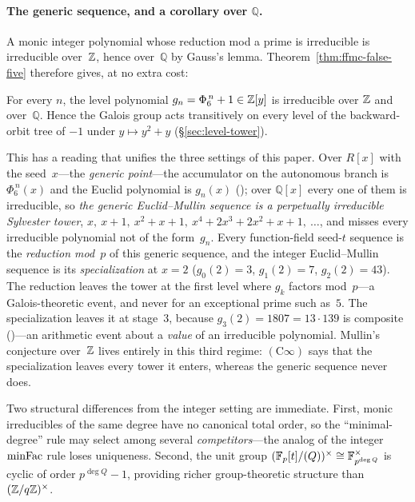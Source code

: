 \paragraph{The generic sequence, and a corollary over $\mathbb{Q}$.}
A monic integer polynomial whose reduction mod a prime is irreducible is
irreducible over~$\mathbb{Z}$, hence over~$\mathbb{Q}$ by Gauss's lemma.
Theorem~\ref{thm:ffmc-false-five} therefore gives, at no extra cost:

\begin{theorem}
\label{thm:level-irreducible-Q}
For every $n$, the level polynomial $g_n = \Phi_6^{\,n} + 1 \in \mathbb{Z}[y]$ is
irreducible over $\mathbb{Z}$ and over~$\mathbb{Q}$.  Hence the Galois group acts
transitively on every level of the backward-orbit tree of $-1$ under
$y \mapsto y^2+y$ (\S\ref{sec:level-tower}).
\end{theorem}

This has a reading that unifies the three settings of this paper.  Over
$R[x]$ with the seed~$x$---the \emph{generic point}---the accumulator on
the autonomous branch is $\Phi_6^{\,n}(x)$ and the Euclid polynomial is
$g_n(x)$ (); over
$\mathbb{Q}[x]$ every one of them is irreducible, so \emph{the generic
Euclid--Mullin sequence is a perpetually irreducible Sylvester tower},
$x,\ x+1,\ x^2+x+1,\ x^4+2x^3+2x^2+x+1,\ \dots$, and misses every
irreducible polynomial not of the form~$g_n$.  Every function-field
seed-$t$ sequence is the \emph{reduction mod~$p$} of this generic
sequence, and the integer Euclid--Mullin sequence is its
\emph{specialization} at $x = 2$
($g_0(2) = 3$, $g_1(2) = 7$, $g_2(2) = 43$).  The reduction leaves the
tower at the first level where $g_k$ factors mod~$p$---a Galois-theoretic
event, and never for an exceptional prime such as~$5$.  The specialization
leaves it at stage~$3$, because $g_3(2) = 1807 = 13\cdot 139$ is composite
()---an
arithmetic event about a \emph{value} of an irreducible polynomial.
Mullin's conjecture over~$\mathbb{Z}$ lives entirely in this third regime:
$(\mathrm{C}\infty)$ says that the specialization leaves every tower it
enters, whereas the generic sequence never does.

Two structural differences from the integer setting are immediate.
First, monic irreducibles of the same degree have no canonical total
order, so the ``minimal-degree'' rule may select among several
\emph{competitors}---the analog of the integer $\mathrm{minFac}$ rule loses
uniqueness.  Second, the unit group
$(\mathbb{F}_p[t]/(Q))^\times \cong \mathbb{F}_{p^{\deg Q}}^\times$ is cyclic of order
$p^{\deg Q}-1$, providing richer group-theoretic structure than
$(\mathbb{Z}/q\mathbb{Z})^\times$.

